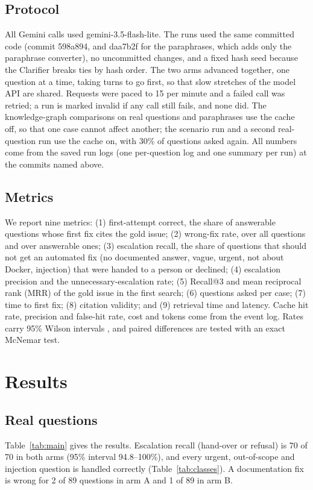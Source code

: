 \documentclass[cameraready]{ieeeconf}
\begin{document}
\subsection{Protocol}
All Gemini calls used gemini-3.5-flash-lite. The runs used the same committed code (commit 598a894, and daa7b2f for the paraphrases, which adds only the paraphrase converter), no uncommitted changes, and a fixed hash seed because the Clarifier breaks ties by hash order. The two arms advanced together, one question at a time, taking turns to go first, so that slow stretches of the model API are shared. Requests were paced to 15 per minute and a failed call was retried; a run is marked invalid if any call still fails, and none did. The knowledge-graph comparisons on real questions and paraphrases use the cache off, so that one case cannot affect another; the scenario run and a second real-question run use the cache on, with 30\% of questions asked again. All numbers come from the saved run logs (one per-question log and one summary per run) at the commits named above.

\subsection{Metrics}
We report nine metrics: (1) first-attempt correct, the share of answerable questions whose first fix cites the gold issue; (2) wrong-fix rate, over all questions and over answerable ones; (3) escalation recall, the share of questions that should not get an automated fix (no documented answer, vague, urgent, not about Docker, injection) that were handed to a person or declined; (4) escalation precision and the unnecessary-escalation rate; (5) Recall@3 and mean reciprocal rank (MRR) of the gold issue in the first search; (6) questions asked per case; (7) time to first fix; (8) citation validity; and (9) retrieval time and latency. Cache hit rate, precision and false-hit rate, cost and tokens come from the event log. Rates carry 95\% Wilson intervals \cite{wilson1927interval}, and paired differences are tested with an exact McNemar test.

\section{Results}\label{sec:results}


\subsection{Real questions}
Table~\ref{tab:main} gives the results. Escalation recall (hand-over or refusal) is 70 of 70 in both arms (95\% interval 94.8--100\%), and every urgent, out-of-scope and injection question is handled correctly (Table~\ref{tab:classes}). A documentation fix is wrong for 2 of 89 questions in arm A and 1 of 89 in arm B.
\end{document}
